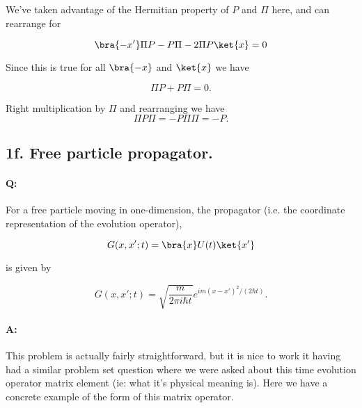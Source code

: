 We've taken advantage of the Hermitian property of $P$ and $\Pi$ here, and can rearrange for

\begin{equation}\label{eqn:qmIexamPractice2007Dec:1b:10}
\bra{-x'} \Pi P - P \Pi - 2 \Pi P \ket{x} = 0
\end{equation}

Since this is true for all $\bra{-x}$ and $\ket{x}$ we have

\begin{equation}\label{eqn:qmIexamPractice2007Dec:1b:20}
\Pi P + P \Pi = 0.
\end{equation}

Right multiplication by $\Pi$ and rearranging we have
\begin{equation}\label{eqn:qmIexamPractice2007Dec:1b:30}
\Pi P \Pi = - P \Pi \Pi = - P.
\end{equation}

\subsection{1f. Free particle propagator.}

\paragraph{Q:} For a free particle moving in one-dimension, the propagator (i.e. the coordinate representation of the evolution operator),

\begin{equation}\label{eqn:qmIexamPractice2007Dec:1f:10}
G(x,x';t) = \bra{x} U(t) \ket{x'}
\end{equation}

is given by

\begin{equation}\label{eqn:qmIexamPractice2007Dec:1f:20}
G(x,x';t) = \sqrt{\frac{m}{2 \pi i \hbar t}} e^{i m (x-x')^2/ (2 \hbar t)}.
\end{equation}

\paragraph{A:}

This problem is actually fairly straightforward, but it is nice to work it having had a similar problem set question where we were asked about this time evolution operator matrix element (ie: what it's physical meaning is).  Here we have a concrete example of the form of this matrix operator.

